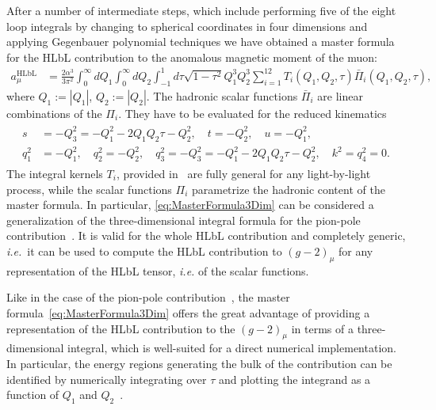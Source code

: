 \documentclass[epj]{webofc}
\newcommand{\<}{\langle}
\renewcommand{\>}{\rangle}
\begin{document}
After a number of intermediate steps, which include performing five of the
eight loop integrals by changing to spherical coordinates in four
dimensions and applying Gegenbauer polynomial techniques we have obtained a
master formula for the HLbL contribution to the anomalous magnetic moment
of the muon: 
\begin{align}
	\label{eq:MasterFormula3Dim}
	a_\mu^\mathrm{HLbL} &= \frac{2 \alpha^3}{3 \pi^2} \int_0^\infty dQ_1 \int_0^\infty dQ_2 \int_{-1}^1 d\tau \sqrt{1-\tau^2} Q_1^3 Q_2^3 \sum_{i=1}^{12} T_i(Q_1,Q_2,\tau) \bar \Pi_i(Q_1,Q_2,\tau) ,
\end{align}
where $Q_1 := |Q_1|$, $Q_2 := |Q_2|$. The hadronic scalar functions
$\bar \Pi_i$ are linear combinations of the $\Pi_i$. 
They have to be evaluated for the reduced kinematics
\begin{align}
	\begin{split}
		s &= - Q_3^2 = -Q_1^2 - 2 Q_1 Q_2 \tau - Q_2^2 , \quad t = -Q_2^2 , \quad u = -Q_1^2 , \\
		q_1^2 &= -Q_1^2, \quad q_2^2 = -Q_2^2, \quad q_3^2 = - Q_3^2 = - Q_1^2 - 2 Q_1 Q_2 \tau - Q_2^2 , \quad k^2 = q_4^2 = 0.
	\end{split}
\end{align}
The integral kernels $T_i$, provided in~\cite{Colangelo:2017fiz} are fully
general for any light-by-light process, while the scalar functions $\Pi_i$
parametrize the hadronic content of the master formula. 
In particular, \eqref{eq:MasterFormula3Dim} can be considered a
generalization of the three-dimensional integral formula for the pion-pole
contribution~\cite{Jegerlehner:2009ry}. It is valid for the whole HLbL
contribution and completely generic, {\em i.e.}\ it can be used to compute the
HLbL contribution to $(g-2)_\mu$ for any representation of the HLbL tensor,
{\em i.e.} of the scalar functions. 

Like in the case of the pion-pole contribution~\cite{Knecht:2001qf}, the
master formula~\eqref{eq:MasterFormula3Dim} offers the great advantage of
providing a representation of the HLbL contribution to the $(g-2)_\mu$ in
terms of a three-dimensional integral, which is well-suited for
a direct numerical implementation. In particular, the energy regions
generating the bulk of the contribution can be identified by numerically
integrating over $\tau$ and plotting the integrand as a function of $Q_1$
and $Q_2$~\cite{Knecht:2001qf,Bijnens:2001cq,Abyaneh:2012ak,Pauk:2014rta}.
\end{document}
